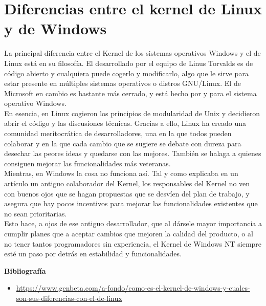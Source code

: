 \documentclass[11pt, a4paper]{report}
\begin{document}
\section*{Diferencias entre el kernel de Linux y de Windows} 

La principal diferencia entre el Kernel de los sistemas operativos Windows y el
de Linux está en su filosofía. El desarrollado por el equipo de Linus Torvalds
es de código abierto y cualquiera puede cogerlo y modificarlo, algo que le
sirve para estar presente en múltiples sistemas operativos o distros GNU/Linux.
El de Microsoft en cambio es bastante más cerrado, y está hecho por y para el
sistema operativo Windows. \\

En esencia, en Linux cogieron los principios de modularidad de Unix y
decidieron abrir el código y las discusiones técnicas. Gracias a ello, Linux ha
creado una comunidad meritocrática de desarrolladores, una en la que todos
pueden colaborar y en la que cada cambio que se sugiere se debate con dureza
para desechar las peores ideas y quedarse con las mejores. También se halaga a
quienes consiguen mejorar las funcionalidades más veteranas. \\

Mientras, en Windows la cosa no funciona así. Tal y como explicaba en un
artículo un antiguo colaborador del Kernel, los responsables del Kernel no ven
con buenos ojos que se hagan propuestas que se desvíen del plan de trabajo, y
asegura que hay pocos incentivos para mejorar las funcionalidades existentes
que no sean prioritarias. \\

Esto hace, a ojos de ese antiguo desarrollador, que al dársele mayor
importancia a cumplir planes que a aceptar cambios que mejoren la calidad del
producto, o al no tener tantos programadores sin experiencia, el Kernel de
Windows NT siempre esté un paso por detrás en estabilidad y funcionalidades. \\


\newpage

\textbf{Bibliografía} \\

\begin{itemize}

\item \url{https://www.genbeta.com/a-fondo/como-es-el-kernel-de-windows-y-cuales-son-sus-diferencias-con-el-de-linux}

\end{itemize}
\end{document}
